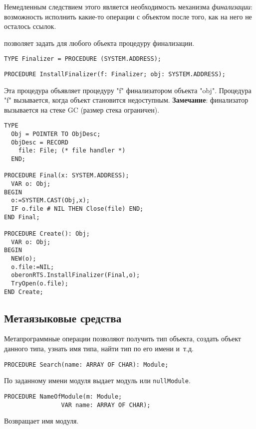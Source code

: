 Немедленным следствием этого является необходимость механизма
{\em финализации}: возможность исполнить какие-то операции 
с объектом после того, как на него не осталось ссылок.

\XDS{} позволяет задать для любого объекта процедуру финализации.

\begin{verbatim}
TYPE Finalizer = PROCEDURE (SYSTEM.ADDRESS);
\end{verbatim}

\begin{verbatim}
PROCEDURE InstallFinalizer(f: Finalizer; obj: SYSTEM.ADDRESS);
\end{verbatim}

Эта процедура объявляет процедуру "f" финализатором объекта "obj".
Процедура "f" вызывается, когда объект становится недоступным.
{\bf Замечание}: финализатор вызывается на стеке
GC (размер стека ограничен).

\Example
\begin{verbatim}
TYPE
  Obj = POINTER TO ObjDesc;
  ObjDesc = RECORD
    file: File; (* file handler *)
  END;

PROCEDURE Final(x: SYSTEM.ADDRESS);
  VAR o: Obj;
BEGIN
  o:=SYSTEM.CAST(Obj,x);
  IF o.file # NIL THEN Close(file) END;
END Final;

PROCEDURE Create(): Obj;
  VAR o: Obj;
BEGIN
  NEW(o);
  o.file:=NIL;
  oberonRTS.InstallFinalizer(Final,o);
  TryOpen(o.file);
END Create;
\end{verbatim}

\subsection{Метаязыковые средства}

Метапрограммные операции позволяют получить тип объекта, создать
объект данного типа, узнать имя типа, найти тип по его имени и~т.д.

\begin{verbatim}
PROCEDURE Search(name: ARRAY OF CHAR): Module;
\end{verbatim}
По заданному имени модуля выдает модуль или {\tt nullModule}.

\begin{verbatim}
PROCEDURE NameOfModule(m: Module;
                VAR name: ARRAY OF CHAR);
\end{verbatim}
Возвращает имя модуля.

